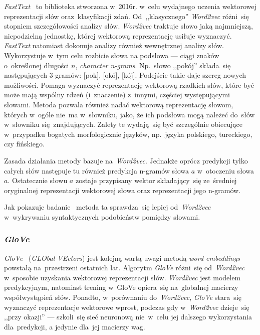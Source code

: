 \documentclass[pl]{minipw} %
\begin{document}
\textit{FastText}~\cite{fasttext} to biblioteka stworzona w~2016r. w~celu wydajnego uczenia wektorowej reprezentacji słów oraz~klasyfikacji zdań. Od~,,klasycznego'' \textit{Word2vec} różni~się stopniem szczegółowości analizy słów. \textit{Word2vec} traktuje słowo jaką najmniejszą, niepodzielną jednostkę, której wektorową reprezentację usiłuje wyznaczyć. \textit{FastText} natomiast dokonuje analizy również wewnętrznej analizy słów. Wykorzystuje w~tym celu rozbicie słowa na podsłowa --- ciągi znaków o~określonej długości $n$, \textit{character n-grams}. Np.~słowo ,,pokój'' składa~się następujących 3-gramów: [pok], [okó], [kój]. Podejście takie daje szereg nowych możliwości. Pomaga wyznaczyć reprezentację wektorową rzadkich słów, które być może mają wspólny rdzeń (i~znaczenie) z~innymi, częściej występującymi słowami. Metoda pozwala również nadać wektorową reprezentację słowom, których w~ogóle nie~ma w~słowniku, jako, że ich podsłowa mogą należeć do~słów w~słowniku się~znajdujących. Zalety te wydają~się być szczególnie obiecujące w~przypadku bogatych morfologicznie języków, np.~języka polskiego, tureckiego, czy fińskiego.

Zasada działania metody bazuje na~\textit{Word2vec}. Jednakże oprócz predykcji tylko całych słów następuje tu również predykcja n-gramów słowa $a$ w~otoczeniu słowa $a$. Ostatecznie słowu $a$ zostaje przypisany wektor składający~się ze~średniej oryginalnej reprezentacji wektorowej słowa oraz reprezentacji jego n-gramów.

Jak pokazuje badanie~\cite{fast_text_word2vec} metoda ta sprawdza~się lepiej od~\textit{Word2vec} w~wykrywaniu syntaktycznych podobieństw pomiędzy słowami. 

\subsubsection{\textit{GloVe}}

\textit{GloVe}~\cite{glove} (\textit{GLObal VEctors}) jest kolejną wartą uwagi metodą \textit{word embeddings} powstałą na~przestrzeni ostatnich lat. Algorytm \textit{GloVe} różni~się od~\textit{Word2vec} w~sposobie uzyskania wektorowej reprezentacji słów. \textit{Word2vec} jest modelem predykcyjnym, natomiast trening w~GloVe opiera~się na~globalnej macierzy współwystąpień słów. Ponadto, w~porównaniu do~\textit{Word2vec}, \textit{GloVe} stara~się wyznaczyć reprezentacje wektorowe wprost, podczas gdy w~\textit{Word2vec} dzieje~się ,,przy okazji'' --- szkoli~się sieć neuronową nie~w~celu jej dalszego wykorzystania dla~predykcji, a jedynie dla~jej macierzy wag. 
\end{document}
